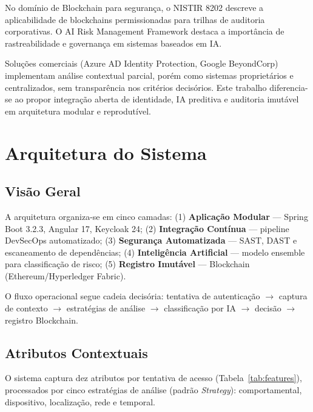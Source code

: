 \documentclass[sigconf,nonacm]{acmart}
\begin{document}
No domínio de Blockchain para segurança, o NISTIR 8202 \cite{nist2018blockchain} descreve a aplicabilidade de blockchains permissionadas para trilhas de auditoria corporativas. O AI Risk Management Framework \cite{nist2023ai} destaca a importância de rastreabilidade e governança em sistemas baseados em IA.

Soluções comerciais (Azure AD Identity Protection, Google BeyondCorp) implementam análise contextual parcial, porém como sistemas proprietários e centralizados, sem transparência nos critérios decisórios. Este trabalho diferencia-se ao propor integração aberta de identidade, IA preditiva e auditoria imutável em arquitetura modular e reprodutível.

\section{Arquitetura do Sistema}

\subsection{Visão Geral}

A arquitetura organiza-se em cinco camadas: (1) \textbf{Aplicação Modular} --- Spring Boot 3.2.3, Angular 17, Keycloak 24; (2) \textbf{Integração Contínua} --- pipeline DevSecOps automatizado; (3) \textbf{Segurança Automatizada} --- SAST, DAST e escaneamento de dependências; (4) \textbf{Inteligência Artificial} --- modelo ensemble para classificação de risco; (5) \textbf{Registro Imutável} --- Blockchain (Ethereum/Hyperledger Fabric).

O fluxo operacional segue cadeia decisória: tentativa de autenticação $\rightarrow$ captura de contexto $\rightarrow$ estratégias de análise $\rightarrow$ classificação por IA $\rightarrow$ decisão $\rightarrow$ registro Blockchain.

\subsection{Atributos Contextuais}

O sistema captura dez atributos por tentativa de acesso (Tabela~\ref{tab:features}), processados por cinco estratégias de análise (padrão \textit{Strategy}): comportamental, dispositivo, localização, rede e temporal.
\end{document}

